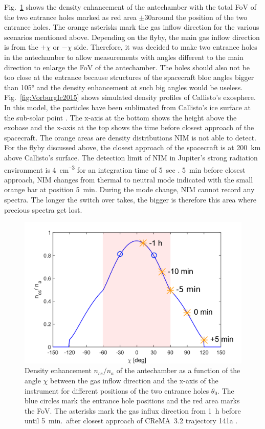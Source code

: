 	Fig.~\ref{fig:densEnhChiFlyby} shows the density enhancement of the antechamber with the total FoV of the two entrance holes marked as red area $\pm$30\degree around the position of the two entrance holes. The orange asterisks mark the gas inflow direction for the various scenarios mentioned above. Depending on the flyby, the main gas inflow direction is from the $+\chi$ or $-\chi$ side. Therefore, it was decided to make two entrance holes in the antechamber to allow measurements with angles different to the main direction to enlarge the FoV of the antechamber. The holes should also not be too close at the entrance because structures of the spacecraft bloc angles bigger than 105° and the density enhancement at such big angles would be useless.\\
	Fig.~\ref{fig:VorburgIc2015} shows simulated density profiles of Callisto's exosphere. In this model, the particles have been sublimated from Callisto's ice surface at the sub-solar point \cite{Vorburger2015}. The x-axis at the bottom shows the height above the exobase and the x-axis at the top shows the time before closest approach of the spacecraft. The orange areas are density distributions NIM is not able to detect. For the flyby discussed above, the closest approach of the spacecraft is at 200~km above Callisto's surface. The detection limit of NIM in Jupiter's strong radiation environment is 4~cm\textsuperscript{--3} for an integration time of 5~sec \cite{Lasi_2017_Detector}. 5~min before closest approach, NIM changes from thermal to neutral mode indicated with the small orange bar at position 5~min. During the mode change, NIM cannot record any spectra. The longer the switch over takes, the bigger is therefore this area where precious spectra get lost.\\
	\begin{figure}[H]
		\centering
		\includegraphics[width=.8\textwidth]{Bilder/Chi_theta0_flyby.png}
		\caption{Density enhancement $n_{cs}/n_a$ of the antechamber as a function of the angle $\chi$ between the gas inflow direction and the x-axis of the instrument for different positions of the two entrance holes $\theta_0$. The blue circles mark the entrance hole positions and the red area marks the FoV. The asterisks mark the gas influx direction from 1~h before until 5~min.\ after closest approach of CReMA~3.2 trajectory 141a \cite{SOC_Crema3p2}.}
		\label{fig:densEnhChiFlyby}
	\end{figure}
